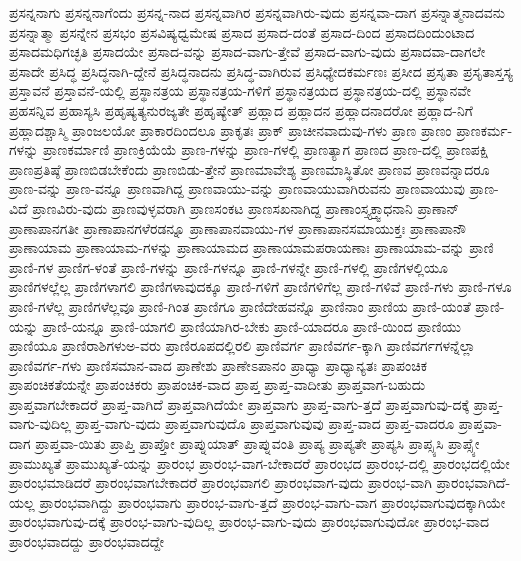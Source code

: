 {ಪ್ರಸನ್ನನಾಗು
ಪ್ರಸನ್ನನಾಗೆಂದು
ಪ್ರಸನ್ನ-ನಾದ
ಪ್ರಸನ್ನವಾಗಿರ
ಪ್ರಸನ್ನವಾಗಿರು-ವುದು
ಪ್ರಸನ್ನವಾ-ದಾಗ
ಪ್ರಸನ್ನಾತ್ಮನಾದವನು
ಪ್ರಸನ್ನಾತ್ಮಾ
ಪ್ರಸನ್ನೇನ
ಪ್ರಸಭಂ
ಪ್ರಸವಿಷ್ಯಧ್ವಮೇಷ
ಪ್ರಸಾದ
ಪ್ರಸಾದ-ದಂತೆ
ಪ್ರಸಾದ-ದಿಂದ
ಪ್ರಸಾದದಿಂದುಂಟಾದ
ಪ್ರಸಾದಮಧಿಗಚ್ಛತಿ
ಪ್ರಸಾದಯೇ
ಪ್ರಸಾದ-ವನ್ನು
ಪ್ರಸಾದ-ವಾಗು-ತ್ತೇವೆ
ಪ್ರಸಾದ-ವಾಗು-ವುದು
ಪ್ರಸಾದವಾ-ದಾಗಲೇ
ಪ್ರಸಾದೇ
ಪ್ರಸಿದ್ಧ
ಪ್ರಸಿದ್ಧನಾಗಿ-ದ್ದೇನೆ
ಪ್ರಸಿದ್ಧನಾದನು
ಪ್ರಸಿದ್ಧ-ವಾಗಿರುವ
ಪ್ರಸಿಧ್ಯೇದಕರ್ಮಣಃ
ಪ್ರಸೀದ
ಪ್ರಸೃತಾ
ಪ್ರಸೃತಾಸ್ತಸ್ಯ
ಪ್ರಸ್ತಾವನೆ
ಪ್ರಸ್ತಾವನೆ-ಯಲ್ಲಿ
ಪ್ರಸ್ಥಾನತ್ರಯ
ಪ್ರಸ್ಥಾನತ್ರಯ-ಗಳಿಗೆ
ಪ್ರಸ್ಥಾನತ್ರಯದ
ಪ್ರಸ್ಥಾನತ್ರಯ-ದಲ್ಲಿ
ಪ್ರಸ್ಥಾನವೇ
ಪ್ರಹಸನ್ನಿವ
ಪ್ರಹಾಸ್ಯಸಿ
ಪ್ರಹೃಷ್ಯತ್ಯನುರಜ್ಯತೇ
ಪ್ರಹೃಷ್ಯೇತ್
ಪ್ರಹ್ಲಾದ
ಪ್ರಹ್ಲಾದನ
ಪ್ರಹ್ಲಾದನಾದರೋ
ಪ್ರಹ್ಲಾದ-ನಿಗೆ
ಪ್ರಹ್ಲಾದಶ್ಚಾಸ್ಮಿ
ಪ್ರಾಂಜಲಯೋ
ಪ್ರಾಕಾರದಿಂದಲೂ
ಪ್ರಾಕೃತಃ
ಪ್ರಾಕ್
ಪ್ರಾಚೀನವಾದುವು-ಗಳು
ಪ್ರಾಣ
ಪ್ರಾಣಂ
ಪ್ರಾಣಕರ್ಮ-ಗಳನ್ನು
ಪ್ರಾಣಕರ್ಮಾಣಿ
ಪ್ರಾಣಕ್ರಿಯೆಯೆ
ಪ್ರಾಣ-ಗಳನ್ನು
ಪ್ರಾಣ-ಗಳಲ್ಲಿ
ಪ್ರಾಣತ್ಯಾಗ
ಪ್ರಾಣದ
ಪ್ರಾಣ-ದಲ್ಲಿ
ಪ್ರಾಣಪಕ್ಷಿ
ಪ್ರಾಣಪ್ರತಿಷ್ಠೆ
ಪ್ರಾಣಬಿಡಬೇಕೆಂದು
ಪ್ರಾಣಬಿಡು-ತ್ತೇನೆ
ಪ್ರಾಣಮಾವೇಶ್ಯ
ಪ್ರಾಣಮಾಸ್ಥಿತೋ
ಪ್ರಾಣವ
ಪ್ರಾಣವನ್ನಾದರೂ
ಪ್ರಾಣ-ವನ್ನು
ಪ್ರಾಣ-ವನ್ನೂ
ಪ್ರಾಣವಾಗಿದ್ದ
ಪ್ರಾಣವಾಯು-ವನ್ನು
ಪ್ರಾಣವಾಯುವಾಗಿರುವನು
ಪ್ರಾಣವಾಯುವು
ಪ್ರಾಣ-ವಿದೆ
ಪ್ರಾಣವಿರು-ವುದು
ಪ್ರಾಣವುಳ್ಳವರಾಗಿ
ಪ್ರಾಣಸಂಕಟ
ಪ್ರಾಣಸಖನಾಗಿದ್ದ
ಪ್ರಾಣಾಂಸ್ತ್ಯಕ್ತ್ವಾಧನಾನಿ
ಪ್ರಾಣಾನ್
ಪ್ರಾಣಾಪಾನಗತೀ
ಪ್ರಾಣಾಪಾನಗಳೆರಡನ್ನೂ
ಪ್ರಾಣಾಪಾನವಾಯು-ಗಳ
ಪ್ರಾಣಾಪಾನಸಮಾಯುಕ್ತಃ
ಪ್ರಾಣಾಪಾನೌ
ಪ್ರಾಣಾಯಾಮ
ಪ್ರಾಣಾಯಾಮ-ಗಳನ್ನು
ಪ್ರಾಣಾಯಾಮದ
ಪ್ರಾಣಾಯಾಮಪರಾಯಣಾಃ
ಪ್ರಾಣಾಯಾಮ-ವನ್ನು
ಪ್ರಾಣಿ
ಪ್ರಾಣಿ-ಗಳ
ಪ್ರಾಣಿಗ-ಳಂತೆ
ಪ್ರಾಣಿ-ಗಳನ್ನು
ಪ್ರಾಣಿ-ಗಳನ್ನೂ
ಪ್ರಾಣಿ-ಗಳನ್ನೇ
ಪ್ರಾಣಿ-ಗಳಲ್ಲಿ
ಪ್ರಾಣಿಗಳಲ್ಲಿಯೂ
ಪ್ರಾಣಿಗಳಲ್ಲೆಲ್ಲ
ಪ್ರಾಣಿಗಳಾಗಲಿ
ಪ್ರಾಣಿಗಳಾವುದಕ್ಕೂ
ಪ್ರಾಣಿ-ಗಳಿಗೆ
ಪ್ರಾಣಿಗಳಿಗೆಲ್ಲ
ಪ್ರಾಣಿ-ಗಳಿವೆ
ಪ್ರಾಣಿ-ಗಳು
ಪ್ರಾಣಿ-ಗಳೂ
ಪ್ರಾಣಿ-ಗಳೆಲ್ಲ
ಪ್ರಾಣಿಗಳೆಲ್ಲವೂ
ಪ್ರಾಣಿ-ಗಿಂತ
ಪ್ರಾಣಿಗೂ
ಪ್ರಾಣಿದೇಹವನ್ನೊ
ಪ್ರಾಣಿನಾಂ
ಪ್ರಾಣಿಯ
ಪ್ರಾಣಿ-ಯಂತೆ
ಪ್ರಾಣಿ-ಯನ್ನು
ಪ್ರಾಣಿ-ಯನ್ನೂ
ಪ್ರಾಣಿ-ಯಾಗಲಿ
ಪ್ರಾಣಿಯಾಗಿರ-ಬೇಕು
ಪ್ರಾಣಿ-ಯಾದರೂ
ಪ್ರಾಣಿ-ಯಿಂದ
ಪ್ರಾಣಿಯು
ಪ್ರಾಣಿಯೂ
ಪ್ರಾಣಿರಾಶಿಗಳುಅ-ವರು
ಪ್ರಾಣಿರೂಪದಲ್ಲಿರಲಿ
ಪ್ರಾಣಿವರ್ಗ
ಪ್ರಾಣಿವರ್ಗ-ಕ್ಕಾಗಿ
ಪ್ರಾಣಿವರ್ಗಗಳನ್ನೆಲ್ಲಾ
ಪ್ರಾಣಿವರ್ಗ-ಗಳು
ಪ್ರಾಣಿಸಮಾನ-ವಾದ
ಪ್ರಾಣೇಶು
ಪ್ರಾಣೇಽಪಾನಂ
ಪ್ರಾಧ್ಯಾ
ಪ್ರಾಧ್ಯಾನ್ಯತಃ
ಪ್ರಾಪಂಚಿಕ
ಪ್ರಾಪಂಚಿಕತೆಯನ್ನೇ
ಪ್ರಾಪಂಚಿಕರು
ಪ್ರಾಪಂಚಿಕ-ವಾದ
ಪ್ರಾಪ್ತ
ಪ್ರಾಪ್ತ-ವಾದೀತು
ಪ್ರಾಪ್ತವಾಗ-ಬಹುದು
ಪ್ರಾಪ್ತವಾಗಬೇಕಾದರೆ
ಪ್ರಾಪ್ತ-ವಾಗಿದೆ
ಪ್ರಾಪ್ತವಾಗಿದೆಯೇ
ಪ್ರಾಪ್ತವಾಗು
ಪ್ರಾಪ್ತ-ವಾಗು-ತ್ತದೆ
ಪ್ರಾಪ್ತವಾಗುವು-ದಕ್ಕೆ
ಪ್ರಾಪ್ತ-ವಾಗು-ವುದಿಲ್ಲ
ಪ್ರಾಪ್ತ-ವಾಗು-ವುದು
ಪ್ರಾಪ್ತವಾಗುವುದೊ
ಪ್ರಾಪ್ತವಾಗುವುವು
ಪ್ರಾಪ್ತ-ವಾದ
ಪ್ರಾಪ್ತ-ವಾದರೂ
ಪ್ರಾಪ್ತವಾ-ದಾಗ
ಪ್ರಾಪ್ತವಾ-ಯಿತು
ಪ್ರಾಪ್ತಿ
ಪ್ರಾಪ್ತೋ
ಪ್ರಾಪ್ನುಯಾತ್
ಪ್ರಾಪ್ನುವಂತಿ
ಪ್ರಾಪ್ಯ
ಪ್ರಾಪ್ಯತೇ
ಪ್ರಾಪ್ಯಸಿ
ಪ್ರಾಪ್ಸ್ಯಸಿ
ಪ್ರಾಪ್ಸ್ಯೇ
ಪ್ರಾಮುಖ್ಯತೆ
ಪ್ರಾಮುಖ್ಯತೆ-ಯನ್ನು
ಪ್ರಾರಂಭ
ಪ್ರಾರಂಭ-ವಾಗ-ಬೇಕಾದರೆ
ಪ್ರಾರಂಭದ
ಪ್ರಾರಂಭ-ದಲ್ಲಿ
ಪ್ರಾರಂಭದಲ್ಲಿಯೇ
ಪ್ರಾರಂಭಮಾಡಿದರೆ
ಪ್ರಾರಂಭವಾಗಬೇಕಾದರೆ
ಪ್ರಾರಂಭವಾಗಲಿ
ಪ್ರಾರಂಭವಾಗ-ವುದು
ಪ್ರಾರಂಭ-ವಾಗಿ
ಪ್ರಾರಂಭವಾಗಿದೆ-ಯಲ್ಲ
ಪ್ರಾರಂಭವಾಗಿದ್ದು
ಪ್ರಾರಂಭವಾಗು
ಪ್ರಾರಂಭ-ವಾಗು-ತ್ತದೆ
ಪ್ರಾರಂಭ-ವಾಗು-ವಾಗ
ಪ್ರಾರಂಭವಾಗುವುದಕ್ಕಾಗಿಯೇ
ಪ್ರಾರಂಭವಾಗುವು-ದಕ್ಕೆ
ಪ್ರಾರಂಭ-ವಾಗು-ವುದಿಲ್ಲ
ಪ್ರಾರಂಭ-ವಾಗು-ವುದು
ಪ್ರಾರಂಭವಾಗುವುದೋ
ಪ್ರಾರಂಭ-ವಾದ
ಪ್ರಾರಂಭವಾದದ್ದು
ಪ್ರಾರಂಭವಾದದ್ದೇ
}
